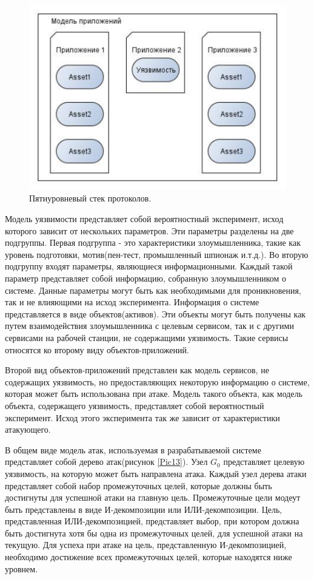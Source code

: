 \documentclass[12pt]{report}
\begin{document}
    \begin{figure}\center
        \includegraphics[width = 120mm]{Ch2Pic12}
        \caption{Пятиуровневый стек протоколов.} \label{Pic12}
    \end{figure}

    Модель уязвимости представляет собой вероятностный эксперимент, исход которого зависит от нескольких параметров. Эти параметры разделены на две подгруппы. Первая подгруппа - это характеристики злоумышленника, такие как уровень подготовки, мотив(пен-тест, промышленный шпионаж и.т.д.). Во вторую подгруппу входят параметры, являющиеся информационными. Каждый такой параметр представляет собой информацию, собранную злоумышленником о системе. Данные параметры могут быть как необходимыми для проникновения, так и не влияющими на исход эксперимента. Информация о системе представляется в виде объектов(активов). Эти объекты могут быть получены как путем взаимодействия злоумышленника с целевым сервисом, так и с другими сервисами на рабочей станции, не содержащими уязвимость. Такие сервисы относятся ко второму виду объектов-приложений.

    Второй вид объектов-приложений представлен как модель сервисов, не содержащих уязвимость, но предоставляющих некоторую информацию о системе, которая может быть использована при атаке. Модель такого объекта, как модель объекта, содержащего уязвимость, представляет собой вероятностный эксперимент. Исход этого эксперимента так же зависит от характеристики атакующего.

    В общем виде модель атак, используемая в разрабатываемой системе представляет собой дерево атак(рисунок \ref{Pic13}). Узел $G_{0}$ представляет целевую уязвимость, на которую может быть направлена атака. Каждый узел дерева атаки представляет собой набор промежуточных целей, которые должны быть достигнуты для успешной атаки на главную цель. Промежуточные цели модеут быть представлены в виде И-декомпозиции или ИЛИ-декомпозиции. Цель, представленная ИЛИ-декомпозицией, представляет выбор, при котором должна быть достигнута хотя бы одна из промежуточных целей, для успешной атаки на текущую. Для успеха при атаке на цель, представленную И-декомпозицией, необходимо достижение всех промежуточных целей, которые находятся ниже уровнем.
\end{document}
